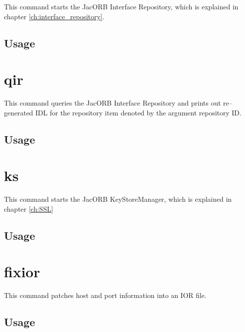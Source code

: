 This command starts the JacORB Interface Repository, which is explained in
chapter \ref{ch:interface_repository}.

\subsection*{Usage}


\section{qir}

This command queries the JacORB Interface Repository and prints out
re--generated IDL for the repository item denoted by the argument
repository ID.

\subsection*{Usage}


\section{ks}

This command starts the JacORB KeyStoreManager, which is explained in
chapter \ref{ch:SSL}

\subsection*{Usage}


\section{fixior}

This command patches host and port information into an IOR file.

\subsection*{Usage}



